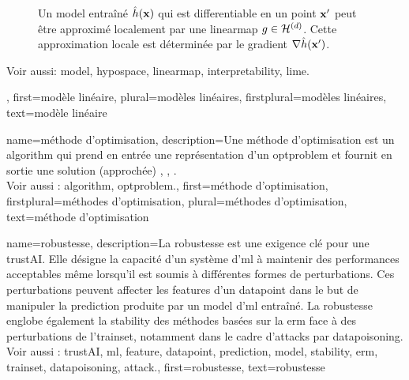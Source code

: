 {{\begin{figure}[H]
\begin{center}
				\vspace*{-5mm}
			\end{center}
			\caption{
				Un \gls{model} entraîné $\hat{h}({\bf x})$ qui est \gls{differentiable} en un point ${\bf x}'$ 
				peut être approximé localement par une \gls{linearmap} $g \in \mathcal{H}^{(d)}$. Cette approximation locale 
				est déterminée par le \gls{gradient} $\nabla \hat{h}({\bf x}')$.}
			\label{fig_linapprox_dict}
		\end{figure}
		Voir aussi: \gls{model}, \gls{hypospace}, \gls{linearmap}, \gls{interpretability}, \gls{lime}.}, 
	first={modèle linéaire},
	plural={modèles linéaires},
	firstplural={modèles linéaires}, 
	text={modèle linéaire}
}

{name={méthode d'optimisation},
	description={Une méthode d'optimisation est un \gls{algorithm} qui 
		prend en entrée une représentation d’un \gls{optproblem} et fournit en sortie une solution (approchée) 
		\cite{BoydConvexBook}, \cite{BertsekasNonLinProgr}, \cite{nesterov04}.
		\\
		Voir aussi : \gls{algorithm}, \gls{optproblem}.},
	first={méthode d'optimisation},
	firstplural={méthodes d'optimisation}, 
	plural={méthodes d'optimisation}, 
	text={méthode d'optimisation}
}

{name={robustesse},
	description={La robustesse est une exigence clé pour une \gls{trustAI}. 
		Elle désigne la capacité d’un système d’\gls{ml} à maintenir des performances acceptables 
		même lorsqu’il est soumis à différentes formes de perturbations. Ces perturbations peuvent 
		affecter les \glspl{feature} d’un \gls{datapoint} dans le but de manipuler la \gls{prediction} 
		produite par un \gls{model} d’\gls{ml} entraîné. La robustesse englobe également la \gls{stability} 
		des méthodes basées sur la \gls{erm} face à des perturbations de l’\gls{trainset}, notamment dans 
		le cadre d’\glspl{attack} par \gls{datapoisoning}. 
		\\
		Voir aussi : \gls{trustAI}, \gls{ml}, \gls{feature}, \gls{datapoint}, \gls{prediction}, \gls{model}, \gls{stability}, \gls{erm}, \gls{trainset}, \gls{datapoisoning}, \gls{attack}.}, 
	first={robustesse}, 
	text={robustesse} 
}

